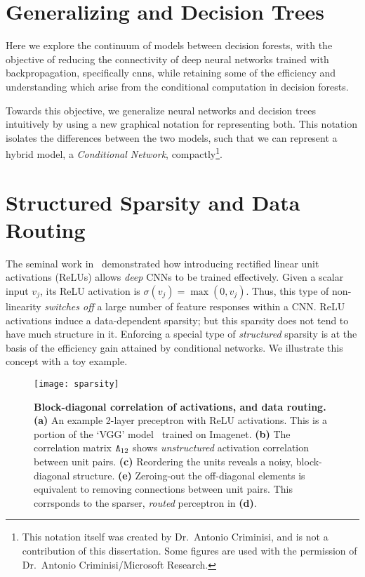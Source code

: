 \documentclass[thesis]{subfiles}
\begin{document}
	\section{Generalizing  and Decision Trees}
	Here we explore the continuum of models between decision forests, with the objective of reducing the connectivity of deep neural networks trained with backpropagation, specifically \glspl{cnn}, while retaining some of the efficiency and understanding which arise from the conditional computation in decision forests.
	
	Towards this objective, we generalize neural networks and decision trees intuitively by using a new graphical notation for representing both. This notation isolates the differences between the two models, such that we can represent a hybrid model, \ie a \emph{Conditional Network}, compactly\footnote{This notation itself was created by Dr.\ Antonio Criminisi, and is not a contribution of this dissertation. Some figures are used with the permission of Dr.\ Antonio Criminisi/Microsoft Research.}.
	
	\section{Structured Sparsity and Data Routing}
	\label{sec:structuredsparsity}
	The seminal work in~\cite{Krizhevsky2012} demonstrated how 
	introducing rectified linear unit activations (ReLUs) allows {\em deep} CNNs to be trained effectively. 
	Given a scalar input $v_j$, its ReLU activation is $\sigma(v_j)=\max(0, v_j)$. 
	Thus, this type of non-linearity \emph{switches off} a large number of feature responses within a CNN.
	ReLU activations induce a data-dependent sparsity; but this sparsity does not tend to have much structure in it. Enforcing a special type of {\em structured} sparsity is at the basis of the efficiency gain attained by conditional networks. We illustrate this concept with a toy example.

	\begin{figure}[tbp]
	\centerline{
	\texttt{[image: sparsity]}
	}
	\caption{{\bf Block-diagonal correlation of activations, and data routing.}
	{\bf (a)} An example 2-layer preceptron with ReLU activations. This is a portion of the `VGG' model~\cite{Simonyan2014verydeep} trained on Imagenet.
	{\bf (b)} The correlation matrix $\mat \Lambda_{12}$ shows {\em unstructured} activation correlation between unit pairs. 
	{\bf (c)} Reordering the units reveals a noisy, block-diagonal structure. 
	{\bf (e)} Zeroing-out the off-diagonal elements is equivalent to removing connections between unit pairs. This corrsponds to the sparser, {\em routed} perceptron in {\bf (d)}.
	}
	\label{fig:sparsity}
	\end{figure}
\end{document}
